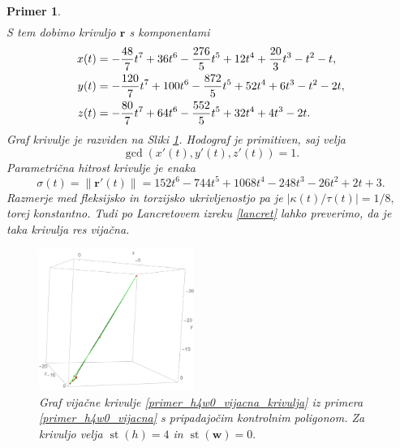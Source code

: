 \documentclass[12pt,a4paper,twoside]{article}
\theoremstyle{definition} %
\theoremstyle{plain} %
\theoremstyle{primerstyle}
\newtheorem{primer}[definicija]{Primer}
\numberwithin{equation}{section}  %
\newcommand{\rV}{\mathbf{r}}
\newcommand{\wV}{\mathbf{w}}
\DeclareMathOperator{\st}{st}
\begin{document}
\begin{primer}
\begin{align*}
	\end{align*}
	S tem dobimo krivuljo $\rV$ s komponentami
	\begin{align}
		x(t)&=-\frac{48}{7}t^7+36t^6-\frac{276}{5}t^5+12t^4+\frac{20}{3}t^3-t^2-t,\notag\\
		y(t)&=-\frac{120}{7}t^7+100t^6-\frac{872}{5}t^5+52t^4+6t^3-t^2-2t,\label{primer_h4w0_vijacna_krivulja}\\
		z(t)&=-\frac{80}{7}t^7+64t^6-\frac{552}{5}t^5+32t^4+4t^3-2t.\notag
	\end{align}
	Graf krivulje je razviden na Sliki \ref{fig:h4w0_vijacna}. Hodograf je primitiven, saj velja $$\gcd(x'(t),y'(t),z'(t))=1.$$ Parametrična hitrost krivulje je enaka
	\begin{equation*}
		\sigma(t)=\lVert\rV'(t)\rVert=152t^6-744t^5+1068t^4-248t^3-26t^2+2t+3.
	\end{equation*}
	Razmerje med fleksijsko in torzijsko ukrivljenostjo pa je $|\kappa(t)/\tau(t)|=1/8,$ torej konstantno. Tudi po Lancretovem izreku \ref{lancret} lahko preverimo, da je taka krivulja res vijačna.
	\begin{figure}[h]
	  \centering
	  \includegraphics[width=0.45\textwidth]{images/h4w0_vijacna.pdf}
	  \caption[Primer vijačne krivulje ($\st(h)=4,$ $\st(\wV)=0$)]{Graf vijačne krivulje \eqref{primer_h4w0_vijacna_krivulja} iz primera \ref{primer_h4w0_vijacna} s pripadajočim kontrolnim poligonom. Za krivuljo velja $\st(h)=4$ in $\st(\wV)=0.$}
	  \label{fig:h4w0_vijacna}
	\end{figure}
\end{primer}
\end{document}
